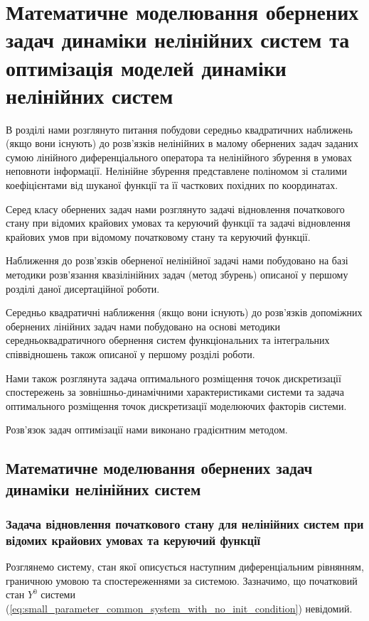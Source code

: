 \chapter{Математичне моделювання обернених задач динаміки нелінійних систем та оптимізація
моделей динаміки нелінійних систем} \label{chapt3}

В розділі нами розглянуто питання побудови середньо квадратичних наближень (якщо вони існують) до розв’язків
нелінійних в малому обернених задач заданих сумою лінійного диференціального оператора та нелінійного збурення в
умовах неповноти інформації. Нелінійне збурення  представлене поліномом зі сталими коефіцієнтами від шуканої
функції та її часткових похідних по координатах.

Серед класу обернених задач нами розглянуто задачі відновлення початкового стану при відомих крайових умовах та
керуючий функції та задачі відновлення крайових умов при відомому початковому стану  та керуючий функції.

Наближення до розв’язків оберненої нелінійної задачі нами побудовано на базі методики розв’язання квазілінійних
задач (метод збурень) описаної у першому розділі даної дисертаційної роботи.

Середньо квадратичні наближення (якщо вони існують) до розв’язків допоміжних обернених лінійних задач нами
побудовано на основі методики середньоквадратичного обернення систем функціональних та інтегральних співвідношень
також описаної у першому розділі роботи.

Нами також розглянута задача оптимального розміщення  точок дискретизації спостережень за зовнішньо-динамічними
характеристиками системи та задача оптимального розміщення  точок дискретизації моделюючих факторів системи.

Розв’язок задач оптимізації нами виконано градієнтним методом.

\section{Математичне моделювання обернених задач динаміки нелінійних систем} \label{sect3_1}

\subsection{Задача відновлення початкового стану для нелінійних систем при відомих крайових
умовах та керуючий функції} \label{sect3_1_1}


Розглянемо систему, стан якої описується наступним диференціальним рівнянням, граничною умовою та спостереженнями
за системою. Зазначимо, що початковий стан $Y^{0}$ системи
(\ref{eq:small_parameter_common_system_with_no_init_condition}) невідомий.


